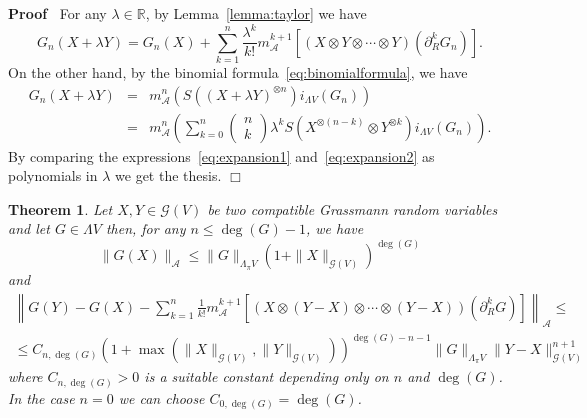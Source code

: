 \documentclass{article}
\newenvironment{proof}{\noindent\textbf{Proof\ }}{\hspace*{\fill}$\Box$\medskip}
\newtheorem{theorem}{Theorem}
\begin{document}
\begin{proof}
  For any $\lambda \in \mathbb{R}$, by Lemma~\ref{lemma:taylor} we have
  \begin{equation}
    G_n (X + \lambda Y) = G_n (X) + \sum_{k = 1}^n \frac{\lambda^k}{k!}
    m_{\mathcal{A}}^{k + 1} [(X \otimes Y \otimes \cdots \otimes Y)
    (\partial_R^k G_n)] . \label{eq:expansion1}
  \end{equation}
  On the other hand, by the binomial formula~{\eqref{eq:binomialformula}}, we
  have
  \begin{eqnarray}
    G_n (X + \lambda Y) & = & m_{\mathcal{A}}^n (S ((X + \lambda Y)^{\otimes
    n}) i_{\Lambda V} (G_n)) \nonumber\\
    & = & m_{\mathcal{A}}^n \left( \sum_{k = 0}^n \left( \begin{array}{c}
      n\\
      k
    \end{array} \right) \lambda^k S (X^{\otimes (n - k)} \otimes Y^{\otimes
    k}) i_{\Lambda V} (G_n) \right) .  \label{eq:expansion2}
  \end{eqnarray}
  By comparing the expressions~{\eqref{eq:expansion1}}
  and~{\eqref{eq:expansion2}} as polynomials in $\lambda$ we get the thesis.
\end{proof}

\begin{theorem}
  \label{theorem_function1}Let $X, Y \in \mathcal{G} (V)$ be two compatible
  Grassmann random variables and let $G \in \Lambda V$ then, for any $n
  \leqslant \deg (G) - 1$, we have
  \begin{equation}
    \| G (X) \|_{\mathcal{A}} \leqslant \| G \|_{\Lambda_{\pi} V} (1 + \| X
    \|_{\mathcal{G} (V)})^{\deg (G)} \label{eq:localbound}
  \end{equation}
  and
  \begin{equation}
    \begin{array}{c}
      \left\| G (Y) - G (X) - \sum_{k = 1}^n \frac{1}{k!} m_{\mathcal{A}}^{k +
      1} [(X \otimes (Y - X) \otimes \cdots \otimes (Y - X)) (\partial_R^k G)]
      \right\|_{\mathcal{A}} \leqslant\\
      \leqslant C_{n, \deg (G)} (1 + \max (\| X \|_{\mathcal{G} (V)}, \| Y
      \|_{\mathcal{G} (V)}))^{\deg (G) - n - 1} \| G \|_{\Lambda_{\pi} V} \| Y
      - X \|_{\mathcal{G} (V)}^{n + 1}
    \end{array} \label{eq:locallip}
  \end{equation}
  where $C_{n, \deg (G)} > 0$ is a suitable constant depending only on $n$ and
  $\deg (G)$. In the case $n = 0$ we can choose $C_{0, \deg (G)} = \deg (G)$.
\end{theorem}
\end{document}
